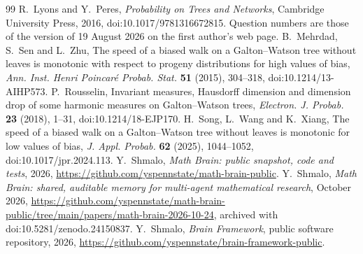\documentclass[11pt]{amsart}
\theoremstyle{definition}
\begin{document}
\begin{thebibliography}{99}
 R.~Lyons and Y.~Peres, \emph{Probability on Trees and Networks}, Cambridge University Press,
2016, doi:10.1017/9781316672815. Question numbers are those of the version of 19 August 2026 on the first
author's web page.
 B.~Mehrdad, S.~Sen and L.~Zhu, The speed of a biased walk on a Galton--Watson tree without leaves is
monotonic with respect to progeny distributions for high values of bias, \emph{Ann. Inst. Henri Poincar\'e
Probab. Stat.} \textbf{51} (2015), 304--318, doi:10.1214/13-AIHP573.
 P.~Rousselin, Invariant measures, Hausdorff dimension and dimension drop of some harmonic
measures on Galton--Watson trees, \emph{Electron. J. Probab.} \textbf{23} (2018), 1--31, doi:10.1214/18-EJP170.
 H.~Song, L.~Wang and K.~Xiang, The speed of a biased walk on a Galton--Watson tree without leaves is
monotonic for low values of bias, \emph{J. Appl. Probab.} \textbf{62} (2025), 1044--1052, doi:10.1017/jpr.2024.113.
 Y.~Shmalo, \emph{Math Brain: public snapshot, code and tests}, 2026,
\url{https://github.com/yspennstate/math-brain-public}.
 Y.~Shmalo, \emph{Math Brain: shared, auditable memory for multi-agent mathematical research},
October 2026, \url{https://github.com/yspennstate/math-brain-public/tree/main/papers/math-brain-2026-10-24},
archived with doi:10.5281/zenodo.24150837.
 Y.~Shmalo, \emph{Brain Framework}, public software repository, 2026,
\url{https://github.com/yspennstate/brain-framework-public}.
\end{thebibliography}
\end{document}

